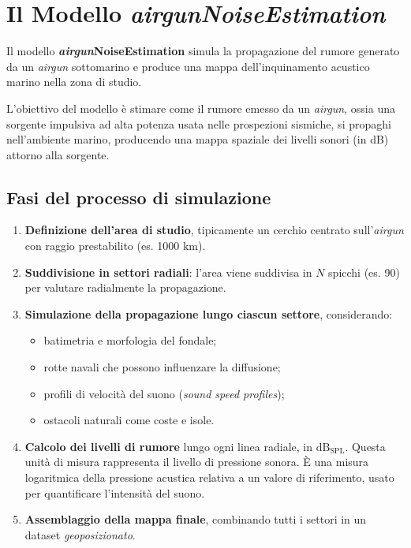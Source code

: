 \section{Il Modello \textit{\textit{airgun}NoiseEstimation}}

Il modello \textbf{\textit{airgun}NoiseEstimation} simula la propagazione del rumore generato da un \textit{\textit{airgun}} sottomarino e produce una mappa dell'inquinamento acustico marino nella zona di studio.

L'obiettivo del modello è stimare come il rumore emesso da un \textit{\textit{airgun}}, ossia una sorgente impulsiva ad alta potenza usata nelle prospezioni sismiche, si propaghi nell'ambiente marino, producendo una mappa spaziale dei livelli sonori (in dB) attorno alla sorgente.

\subsection{Fasi del processo di simulazione}

\begin{enumerate}
  \item \textbf{Definizione dell'area di studio}, tipicamente un cerchio centrato sull'\textit{\textit{airgun}} con raggio prestabilito (es. 1000 km).
  \item \textbf{Suddivisione in settori radiali}: l'area viene suddivisa in \(N\) spicchi (es. 90) per valutare radialmente la propagazione.
  \item \textbf{Simulazione della propagazione lungo ciascun settore}, considerando:
    \begin{itemize}
      \item batimetria e morfologia del fondale;
      \item rotte navali che possono influenzare la diffusione;
      \item profili di velocità del suono (\textit{sound speed profiles});
      \item ostacoli naturali come coste e isole.
    \end{itemize}
  \item \textbf{Calcolo dei livelli di rumore} lungo ogni linea radiale, in \(\mathrm{dB_{SPL}}\). Questa unità di misura rappresenta il livello di pressione sonora. È una misura logaritmica della pressione acustica relativa a un valore di riferimento, usato per quantificare l'intensità del suono. \cite{db-spl-definition}
  \item \textbf{Assemblaggio della mappa finale}, combinando tutti i settori in un dataset \textit{geoposizionato}.
\end{enumerate}

